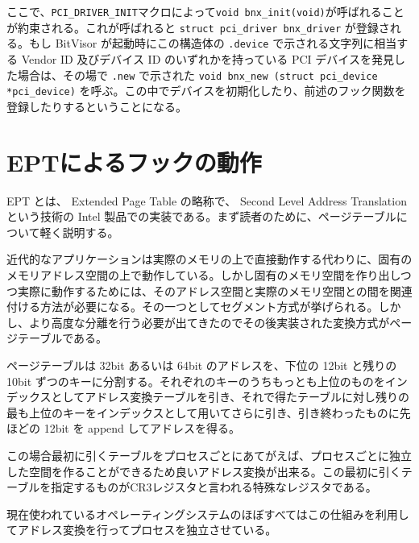 \documentclass[a4paper,11pt,report]{ltjsbook}
\begin{document}
ここで、\lstinline!PCI_DRIVER_INIT!マクロによって\lstinline!void bnx_init(void)!が呼ばれることが約束される。これが呼ばれると \lstinline{struct pci_driver bnx_driver} が登録される。もし BitVisor が起動時にこの構造体の \lstinline{.device} で示される文字列に相当する Vendor ID 及びデバイス ID のいずれかを持っている PCI デバイスを発見した場合は、その場で \lstinline{.new} で示された \lstinline{void bnx_new (struct pci_device *pci_device)} を呼ぶ。この中でデバイスを初期化したり、前述のフック関数を登録したりするということになる。


\section{EPTによるフックの動作}
\label{aboutEPT}
EPT とは、 Extended Page Table の略称で、 Second Level Address Translation という技術の Intel 製品での実装である。まず読者のために、ページテーブルについて軽く説明する。

近代的なアプリケーションは実際のメモリの上で直接動作する代わりに、固有のメモリアドレス空間の上で動作している。しかし固有のメモリ空間を作り出しつつ実際に動作するためには、そのアドレス空間と実際のメモリ空間との間を関連付ける方法が必要になる。その一つとしてセグメント方式が挙げられる。しかし、より高度な分離を行う必要が出てきたのでその後実装された変換方式がページテーブルである。

ページテーブルは 32bit あるいは 64bit のアドレスを、下位の 12bit と残りの 10bit ずつのキーに分割する。それぞれのキーのうちもっとも上位のものをインデックスとしてアドレス変換テーブルを引き、それで得たテーブルに対し残りの最も上位のキーをインデックスとして用いてさらに引き、引き終わったものに先ほどの 12bit を append してアドレスを得る。

この場合最初に引くテーブルをプロセスごとにあてがえば、プロセスごとに独立した空間を作ることができるため良いアドレス変換が出来る。この最初に引くテーブルを指定するものがCR3レジスタと言われる特殊なレジスタである。

現在使われているオペレーティングシステムのほぼすべてはこの仕組みを利用してアドレス変換を行ってプロセスを独立させている。
\end{document}
